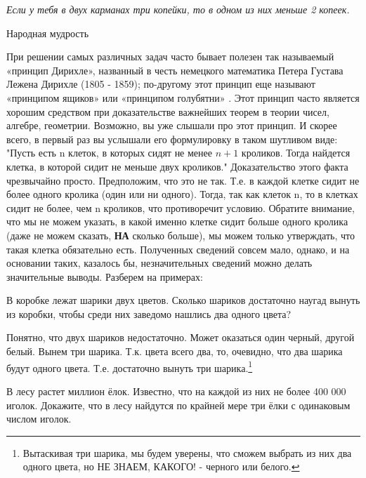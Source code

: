 \epigraph{\textit{Если у тебя в двух карманах три копейки, то в одном из них меньше 2 копеек.}}{Народная мудрость}

При решении самых различных задач часто бывает полезен так называемый «принцип Дирихле», названный в честь немецкого математика Петера Густава Лежена Дирихле (1805 - 1859); по-другому этот принцип еще называют «принципом ящиков» или «принципом голубятни» . Этот принцип часто является хорошим средством при доказательстве важнейших теорем  в теории чисел, алгебре, геометрии. Возможно, вы уже слышали про этот принцип. И скорее всего, в первый раз вы услышали его формулировку в таком шутливом виде: "Пусть есть n клеток, в которых сидят не менее $n+1$ кроликов. Тогда найдется клетка, в которой сидит не меньше двух кроликов." Доказательство этого факта чрезвычайно просто. Предположим, что это не так. Т.е. в каждой клетке сидит не более одного кролика (один или ни одного). Тогда, так как клеток n, то в клетках сидит не более, чем n кроликов, что противоречит условию. Обратите внимание, что мы не можем указать, в какой именно клетке сидит больше одного кролика (даже не можем сказать, \textbf{НА} сколько больше), мы можем только утверждать, что такая клетка обязательно есть. Полученных сведений совсем мало, однако, и на основании таких, казалось бы, незначительных сведений можно делать значительные выводы.
Разберем на примерах:
\begin{thm}
	В коробке лежат шарики двух цветов. Сколько шариков достаточно наугад вынуть из коробки, чтобы среди них заведомо нашлись два одного цвета? 
\end{thm}

\begin{prf}
	Понятно, что двух шариков недостаточно. Может оказаться один черный, другой белый. Вынем три шарика. Т.к. цвета всего два, то, очевидно, что два шарика будут одного цвета. Т.е. достаточно вынуть три шарика.\footnote{Вытаскивая три шарика, мы будем уверены, что сможем выбрать из них два одного цвета, но НЕ ЗНАЕМ, КАКОГО! - черного или белого.}
\end{prf}

\begin{thm}
	В лесу растет миллион ёлок. Известно, что на каждой из них не более 400 000 иголок. Докажите, что в лесу найдутся по крайней мере три ёлки с одинаковым числом иголок.
\end{thm}

